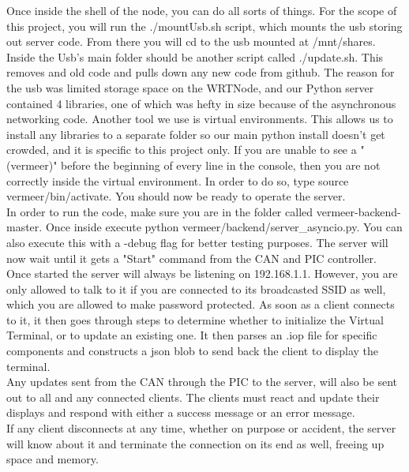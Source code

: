 \documentclass[paper=a4, fontsize=11pt]{scrartcl}
\numberwithin{equation}{section}		%
\numberwithin{figure}{section}			%
\numberwithin{table}{section}				%
\begin{document}
 Once inside the shell of the node, you can do all sorts of things. For the scope of this project, you will run the ./mountUsb.sh script, which mounts the usb storing out server code. From there you will cd to the usb mounted at /mnt/shares. Inside the Usb's main folder should be another script called ./update.sh. This removes and old code and pulls down any new code from github. The reason for the usb was limited storage space on the WRTNode, and our Python server contained 4 libraries, one of which was hefty in size because of the asynchronous networking code. Another tool we use is virtual environments. This allows us to install any libraries to a separate folder so our main python install doesn't get crowded, and it is specific to this project only. If you are unable to see a "(vermeer)" before the beginning of every line in the console, then you are not correctly inside the virtual environment. In order to do so, type source vermeer/bin/activate. You should now be ready to operate the server.\\
 
 In order to run the code, make sure you are in the folder called vermeer-backend-master. Once inside execute python vermeer/backend/server\_asyncio.py. You can also execute this with a -debug flag for better testing purposes. The server will now wait until it gets a "Start" command from the CAN and PIC controller. Once started the server will always be listening on 192.168.1.1. However, you are only allowed to talk to it if you are connected to its broadcasted SSID as well, which you are allowed to make password protected. As soon as a client connects to it, it then goes through steps to determine whether to initialize the Virtual Terminal, or to update an existing one. It then parses an .iop file for specific components and constructs a json blob to send back the client to display the terminal. \\
 
 Any updates sent from the CAN through the PIC to the server, will also be sent out to all and any connected clients. The clients must react and update their displays and respond with either a success message or an error message. \\
 
 If any client disconnects at any time, whether on purpose or accident, the server will know about it and terminate the connection on its end as well, freeing up space and memory. \\
\end{document}
